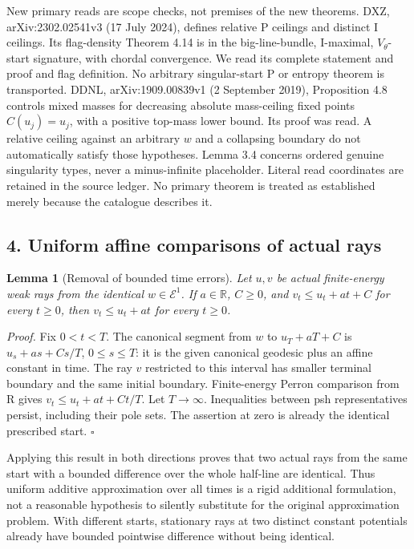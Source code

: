 \documentclass[
  11pt,
]{article}
\newtheorem{lemma}[theorem]{Lemma}
\begin{document}
New primary reads are scope checks, not premises of the new theorems.
DXZ, arXiv:2302.02541v3 (17 July 2024), defines relative P ceilings and
distinct I ceilings. Its flag-density Theorem 4.14 is in the
big-line-bundle, I-maximal, \(V_\theta\)-start signature, with chordal
convergence. We read its complete statement and proof and flag
definition. No arbitrary singular-start P or entropy theorem is
transported. DDNL, arXiv:1909.00839v1 (2 September 2019), Proposition
4.8 controls mixed masses for decreasing absolute mass-ceiling fixed
points \(C(u_j)=u_j\), with a positive top-mass lower bound. Its proof
was read. A relative ceiling against an arbitrary \(w\) and a collapsing
boundary do not automatically satisfy those hypotheses. Lemma 3.4
concerns ordered genuine singularity types, never a minus-infinite
placeholder. Literal read coordinates are retained in the source ledger.
No primary theorem is treated as established merely because the
catalogue describes it.

\subsection{4. Uniform affine comparisons of actual
rays}\label{uniform-affine-comparisons-of-actual-rays}

\begin{lemma}[Removal of bounded time errors]\label{remove}
Let $u,v$ be actual finite-energy weak rays from the identical
$w\in\mathcal E^1$. If $a\in\mathbb R$, $C\ge0$, and
$v_t\le u_t+at+C$ for every $t\ge0$, then
$v_t\le u_t+at$ for every $t\ge0$.
\end{lemma}

\emph{Proof.} Fix \(0<t<T\). The canonical segment from \(w\) to
\(u_T+aT+C\) is \(u_s+as+Cs/T\), \(0\le s\le T\): it is the given
canonical geodesic plus an affine constant in time. The ray \(v\)
restricted to this interval has smaller terminal boundary and the same
initial boundary. Finite-energy Perron comparison from R gives
\(v_t\le u_t+at+Ct/T\). Let \(T\to\infty\). Inequalities between psh
representatives persist, including their pole sets. The assertion at
zero is already the identical prescribed start. \(\square\)

Applying this result in both directions proves that two actual rays from
the same start with a bounded difference over the whole half-line are
identical. Thus uniform additive approximation over all times is a rigid
additional formulation, not a reasonable hypothesis to silently
substitute for the original approximation problem. With different
starts, stationary rays at two distinct constant potentials already have
bounded pointwise difference without being identical.
\end{document}
